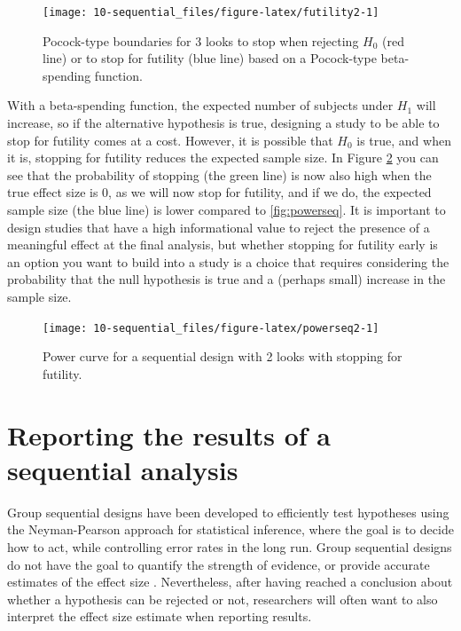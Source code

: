 \documentclass[
  oneside]{krantz}
\begin{document}
\begin{figure}

{\centering \texttt{[image: 10-sequential\_files/figure-latex/futility2-1]} 

}

\caption{Pocock-type boundaries for 3 looks to stop when rejecting \(H_0\) (red line) or to stop for futility (blue line) based on a Pocock-type beta-spending function.}\label{fig:futility2}
\end{figure}

With a beta-spending function, the expected number of subjects under \(H_1\) will increase, so if the alternative hypothesis is true, designing a study to be able to stop for futility comes at a cost. However, it is possible that \(H_0\) is true, and when it is, stopping for futility reduces the expected sample size. In Figure \ref{fig:powerseq2} you can see that the probability of stopping (the green line) is now also high when the true effect size is 0, as we will now stop for futility, and if we do, the expected sample size (the blue line) is lower compared to \ref{fig:powerseq}. It is important to design studies that have a high informational value to reject the presence of a meaningful effect at the final analysis, but whether stopping for futility early is an option you want to build into a study is a choice that requires considering the probability that the null hypothesis is true and a (perhaps small) increase in the sample size.



\begin{figure}

{\centering \texttt{[image: 10-sequential\_files/figure-latex/powerseq2-1]} 

}

\caption{Power curve for a sequential design with 2 looks with stopping for futility.}\label{fig:powerseq2}
\end{figure}

\hypertarget{reporting-the-results-of-a-sequential-analysis}{%
\section{Reporting the results of a sequential analysis}\label{reporting-the-results-of-a-sequential-analysis}}

Group sequential designs have been developed to efficiently test hypotheses using the Neyman-Pearson approach for statistical inference, where the goal is to decide how to act, while controlling error rates in the long run. Group sequential designs do not have the goal to quantify the strength of evidence, or provide accurate estimates of the effect size \citep{proschan_statistical_2006}. Nevertheless, after having reached a conclusion about whether a hypothesis can be rejected or not, researchers will often want to also interpret the effect size estimate when reporting results.
\end{document}
